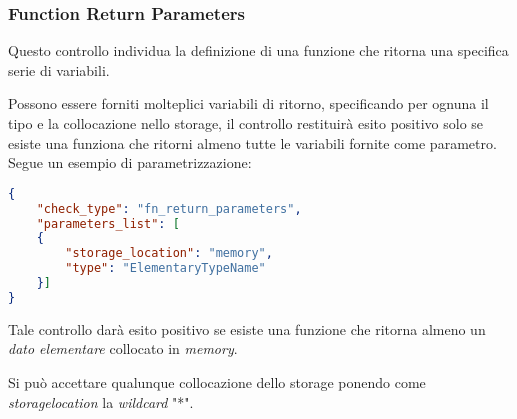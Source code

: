 \subsubsection{Function Return Parameters}
Questo controllo individua la definizione di una funzione che ritorna una specifica serie di variabili.\par Possono essere forniti molteplici variabili di ritorno, specificando per ognuna il tipo e la collocazione nello storage, il controllo restituirà esito positivo solo se esiste una funziona che ritorni almeno tutte le variabili fornite come parametro.
Segue un esempio di parametrizzazione:
{\begin{lstlisting}[language=json, caption={Parametrizzazione del controllo Function Return Parameters}]
{
	"check_type": "fn_return_parameters",
	"parameters_list": [
	{
		"storage_location": "memory",
		"type": "ElementaryTypeName"
	}]
}\end{lstlisting}}
\noindent Tale controllo darà esito positivo se esiste una funzione che ritorna almeno un \textit{dato elementare} collocato in \textit{memory}.\par
Si può accettare qualunque collocazione dello storage ponendo come \textit{storage\textunderscore location} la \textit{wildcard} "*".

